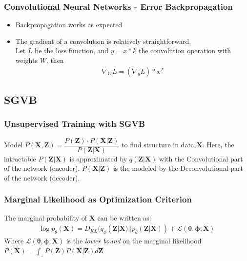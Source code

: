 \documentclass{beamer}
\begin{document}
\begin{frame}
\frametitle{Convolutional Neural Networks - Error Backpropagation}

\begin{itemize}

\item Backpropagation works as expected
\item The gradient of a convolution is relatively straightforward.\\ Let $L$ be the loss function, and $y = x * k$ the convolution operation with weights $W$, then \\   

\begin{align*}
\nabla_W L = (\nabla_y L) * x^T 
\end{align*}

\end{itemize}

\end{frame}



\subsection{SGVB}
\begin{frame}
\frametitle{Unsupervised Training with SGVB}
Model $P(\mathbf{X},\mathbf{Z}) = \dfrac{P(\mathbf{Z})\cdot P(\mathbf{X}|\mathbf{Z})}{P(\mathbf{Z}|\mathbf{X})}$ to find structure in data $\mathbf{X}$. \vspace{0.5mm}
Here, the intractable $P(\mathbf{Z}|\mathbf{X})$ is approximated by $q(\mathbf{Z}|\mathbf{X})$ with the Convolutional part of the network (encoder). $P(\mathbf{X}|\mathbf{Z})$ is the modeled by the Deconvolutional part of the network (decoder).

\end{frame}

\begin{frame}
\frametitle{Marginal Likelihood as Optimization Criterion}
The marginal probability of $\mathbf{X}$ can be written as:
\begin{align*}
\log p_\theta(\mathbf{X}) = D_{KL}(q_\phi(\mathbf{Z}|\mathbf{X}) || p_\theta(\mathbf{Z}|\mathbf{X})) + \mathcal{L}(\mathbf{\theta}, \mathbf{\phi}; \mathbf{X})
\end{align*}
Where 
$\mathcal{L}(\mathbf{\theta}, \mathbf{\phi}; \mathbf{X})$
is the \textit{lower bound} on the marginal likelihood
$
P(\mathbf{X}) = \int_z P(\mathbf{Z})P(\mathbf{X}|\mathbf{Z})d\mathbf{Z}$
\end{frame}
\end{document}
